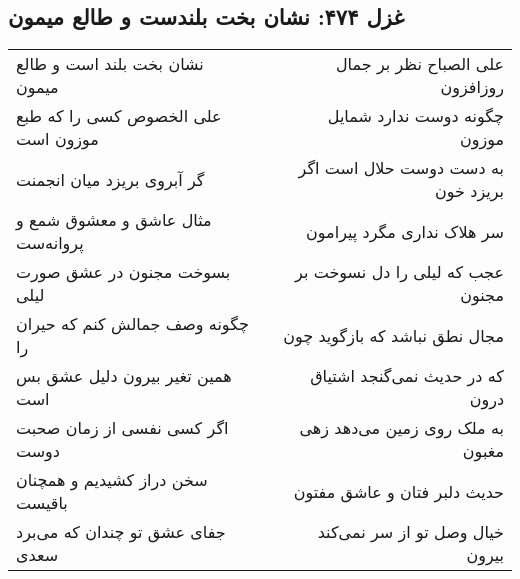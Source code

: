 \begin{center}
\section*{غزل ۴۷۴: نشان بخت بلندست و طالع میمون}
\label{sec:474}
\begin{longtable}{l p{0.5cm} r}
نشان بخت بلند است و طالع میمون
&&
علی الصباح نظر بر جمال روزافزون
\\
علی الخصوص کسی را که طبع موزون است
&&
چگونه دوست ندارد شمایل موزون
\\
گر آبروی بریزد میان انجمنت
&&
به دست دوست حلال است اگر بریزد خون
\\
مثال عاشق و معشوق شمع و پروانه‌ست
&&
سر هلاک نداری مگرد پیرامون
\\
بسوخت مجنون در عشق صورت لیلی
&&
عجب که لیلی را دل نسوخت بر مجنون
\\
چگونه وصف جمالش کنم که حیران را
&&
مجال نطق نباشد که بازگوید چون
\\
همین تغیر بیرون دلیل عشق بس است
&&
که در حدیث نمی‌گنجد اشتیاق درون
\\
اگر کسی نفسی از زمان صحبت دوست
&&
به ملک روی زمین می‌دهد زهی مغبون
\\
سخن دراز کشیدیم و همچنان باقیست
&&
حدیث دلبر فتان و عاشق مفتون
\\
جفای عشق تو چندان که می‌برد سعدی
&&
خیال وصل تو از سر نمی‌کند بیرون
\\
\end{longtable}
\end{center}
